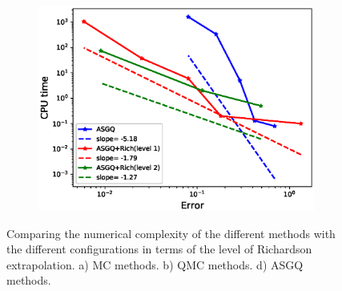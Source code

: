 \begin{figure}[htb]
\begin{subfigure}{0.33\textwidth}
		\includegraphics[width=\linewidth]{./figures/rBergomi_Complexity_rates/set2/error_vs_time_set2_MISC_comparison}
		\caption{}
		\label{fig:3}
	\end{subfigure}
	\caption{Comparing the numerical complexity of the different  methods with the different configurations in terms of the level of Richardson extrapolation. a) MC methods. b) QMC methods. d) ASGQ methods.}
	\label{fig: Comparing the numerical complexity of the different  methods with the different configurations}
\end{figure}
\FloatBarrier

